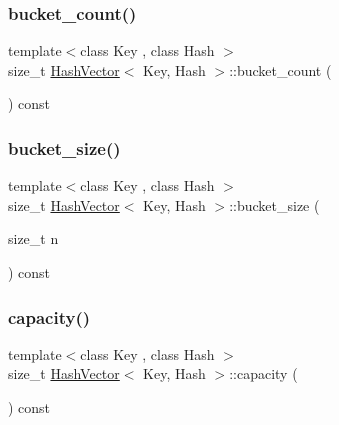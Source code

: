\subsubsection{\texorpdfstring{bucket\+\_\+count()}{bucket\_count()}}
{\footnotesize\ttfamily template$<$class Key , class Hash $>$ \\
size\+\_\+t \mbox{\hyperlink{class_hash_vector}{Hash\+Vector}}$<$ Key, Hash $>$\+::bucket\+\_\+count (\begin{DoxyParamCaption}{ }\end{DoxyParamCaption}) const}

\mbox{\label{class_hash_vector_a55b776a683a7bc4b8f56e2132ac9ee92}} 
\subsubsection{\texorpdfstring{bucket\+\_\+size()}{bucket\_size()}}
{\footnotesize\ttfamily template$<$class Key , class Hash $>$ \\
size\+\_\+t \mbox{\hyperlink{class_hash_vector}{Hash\+Vector}}$<$ Key, Hash $>$\+::bucket\+\_\+size (\begin{DoxyParamCaption}\item[{size\+\_\+t}]{n }\end{DoxyParamCaption}) const}

\mbox{\label{class_hash_vector_adcb769646427cc00272f07b65d488158}} 
\subsubsection{\texorpdfstring{capacity()}{capacity()}}
{\footnotesize\ttfamily template$<$class Key , class Hash $>$ \\
size\+\_\+t \mbox{\hyperlink{class_hash_vector}{Hash\+Vector}}$<$ Key, Hash $>$\+::capacity (\begin{DoxyParamCaption}{ }\end{DoxyParamCaption}) const}

\mbox{\label{class_hash_vector_a7a31136b1ede5d312c60c863b8ead712}} 
